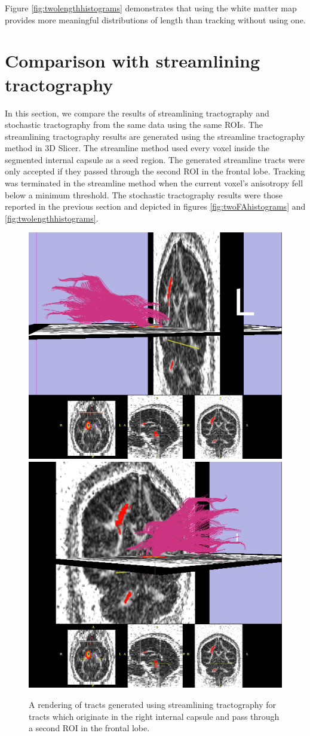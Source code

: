 Figure \ref{fig:twolengthhistograms} demonstrates that using the white matter map provides more meaningful distributions of length than tracking without using one.

\section{Comparison with streamlining tractography}
In this section, we compare the results of streamlining tractography and stochastic tractography from the same data using the same ROIs.  The streamlining tractography results are generated using the streamline tractography method in 3D Slicer.  The streamline method used every voxel inside the segmented internal capsule as a seed region.  The generated streamline tracts were only accepted if they passed through the second ROI in the frontal lobe.  Tracking was terminated in the streamline method when the current voxel's anisotropy fell below a minimum threshold.  The stochastic tractography results were those reported in the previous section and depicted in figures \ref{fig:twoFAhistograms} and \ref{fig:twolengthhistograms}.

\begin{figure}
  \center
	  \includegraphics[width=0.75\linewidth]
	    {slicer-0016}
	  \includegraphics[width=0.75\linewidth]
	    {slicer-0018}
	  \caption{A rendering of tracts generated using streamlining tractography for tracts which originate in the right internal capsule and pass through a second ROI in the frontal lobe.}
	  \label{fig:streamlinerendering}
\end{figure}

